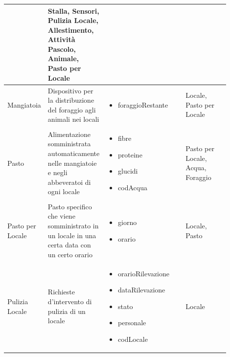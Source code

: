 \documentclass[12pt,a4paper]{article}
\begin{document}
\begin{center}
\begin{longtable}{|p{0.14\linewidth}|p{0.20\linewidth}|p{0.36\linewidth}|p{0.20\linewidth}|}
\begin{itemize}
					\end{itemize}
					&  Stalla, Sensori, Pulizia Locale, Allestimento, Attività Pascolo, Animale, Pasto per Locale \\

\hline
Mangiatoia 		&  Dispositivo per la distribuzione del foraggio agli animali nei locali 
					& \begin{itemize}
						\setlength{\itemindent}{-1em}
						\vspace{-25pt}
						\setlength\itemsep{-0.25em}
						\item foraggioRestante
						
						
						
					\end{itemize}
					&  Locale, Pasto per Locale\\

\hline
Pasto 				&  Alimentazione somministrata automaticamente nelle mangiatoie e negli abbeveratoi di ogni locale 
					& \begin{itemize}
						\setlength{\itemindent}{-1em}
						\vspace{-25pt}
						\setlength\itemsep{-0.25em}
						\item fibre
						\item proteine
						\item glucidi
						\item codAcqua
						
						
						
						
					\end{itemize}
					&  Pasto per Locale, Acqua, Foraggio \\

\hline
Pasto per Locale 				&  Pasto specifico che viene somministrato in un locale in una certa data con un certo orario 
					& \begin{itemize}
						\setlength{\itemindent}{-1em}
						\vspace{-25pt}
						\setlength\itemsep{-0.25em}
						\item giorno
						\item orario
					\end{itemize}
					&  Locale, Pasto \\

\hline
Pulizia Locale 		&  Richieste d'intervento di pulizia di un locale 
					& \begin{itemize}
						\setlength{\itemindent}{-1em}
						\vspace{-25pt}
						\setlength\itemsep{-0.25em}
						\item orarioRilevazione
						\item dataRilevazione
						\item stato
						\item personale
						\item codLocale
					\end{itemize}
					&  Locale \\


\end{longtable}
\end{center}
\end{document}
